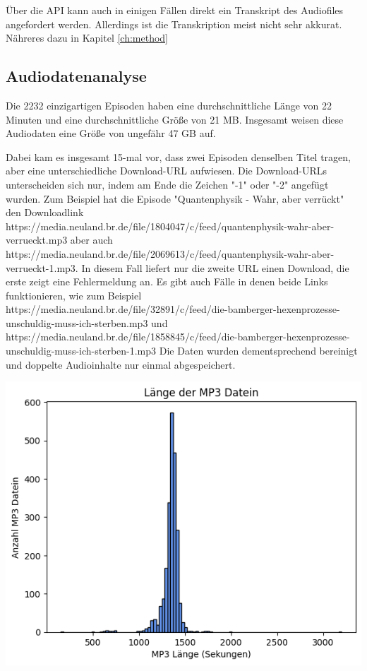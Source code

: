 Über die API kann auch in einigen Fällen direkt ein Transkript des Audiofiles angefordert werden. 
Allerdings ist die Transkription meist nicht sehr akkurat.
Nähreres dazu in Kapitel \autoref{ch:method}


\subsection{Audiodatenanalyse}


Die 2232 einzigartigen Episoden haben eine durchschnittliche Länge von 22 Minuten und eine durchschnittliche Größe von 21 MB.
Insgesamt weisen diese Audiodaten eine Größe von ungefähr 47 GB auf. 

Dabei kam es insgesamt 15-mal vor, dass zwei Episoden denselben Titel tragen, aber eine unterschiedliche Download-URL aufwiesen.
Die Download-URLs unterscheiden sich nur, indem am Ende die Zeichen "-1" oder "-2" angefügt wurden.
Zum Beispiel hat die Episode "Quantenphysik - Wahr, aber verrückt" den Downloadlink https://media.neuland.br.de/file/1804047/c/feed/quantenphysik-wahr-aber-verrueckt.mp3 aber auch https://media.neuland.br.de/file/2069613/c/feed/quantenphysik-wahr-aber-verrueckt-1.mp3.
In diesem Fall liefert nur die zweite URL einen Download, die erste zeigt eine Fehlermeldung an.
Es gibt auch Fälle in denen beide Links funktionieren, wie zum Beispiel 
https://media.neuland.br.de/file/32891/c/feed/die-bamberger-hexenprozesse-unschuldig-muss-ich-sterben.mp3 und
https://media.neuland.br.de/file/1858845/c/feed/die-bamberger-hexenprozesse-unschuldig-muss-ich-sterben-1.mp3 
Die Daten wurden dementsprechend bereinigt und doppelte Audioinhalte nur einmal abgespeichert.



\includegraphics[width=\linewidth]{figures/mp3_length.png}


